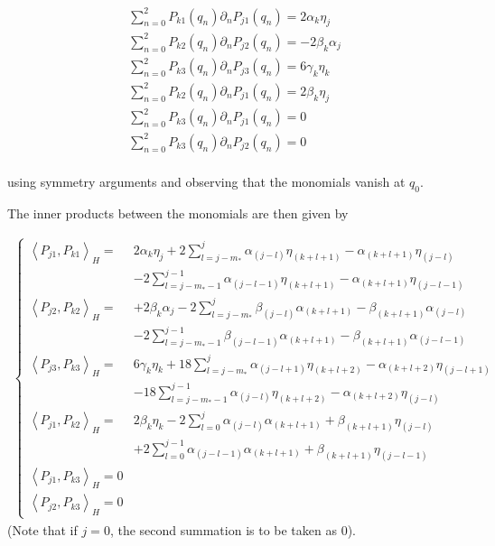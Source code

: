 \documentclass[12pt]{article}
\theoremstyle{plain}
\theoremstyle{definition}
\theoremstyle{remark}
\newcommand{\inner}[2]{\left \langle #1, #2\right \rangle}
\begin{document}
\begin{gather*}
    \sum_{n = 0}^2 P_{k1}(q_n)\partial_nP_{j1}(q_n) = 2\alpha_k\eta_j\\
    \sum_{n = 0}^2 P_{k2}(q_n)\partial_nP_{j2}(q_n) = -2\beta_k\alpha_j\\
    \sum_{n = 0}^2 P_{k3}(q_n)\partial_nP_{j3}(q_n) = 6\gamma_k\eta_k\\
    \sum_{n = 0}^2 P_{k2}(q_n)\partial_nP_{j1}(q_n) = 2\beta_k\eta_j\\
    \sum_{n = 0}^2 P_{k3}(q_n)\partial_nP_{j1}(q_n) = 0\\
    \sum_{n = 0}^2 P_{k3}(q_n)\partial_nP_{j2}(q_n) = 0\\
\end{gather*}

using symmetry arguments and observing that the monomials vanish at $q_0$.


The inner products between the monomials are then given by

\begin{align}
    \begin{cases}
    \inner{P_{j1}}{P_{k1}}_H =  &2\alpha_k\eta_j + 2\sum\limits_{l=j-m_*}^j \alpha_{(j-l)}\eta_{(k+l+1)} - \alpha_{(k+l+1)}\eta_{(j-l)} \\[20pt]&- 2\sum\limits_{l=j-m_*-1}^{j-1} \alpha_{(j-l-1)}\eta_{(k+l+1)} - \alpha_{(k+l+1)}\eta_{(j-l-1)} \\[20pt]
    \inner{P_{j2}}{P_{k2}}_H = &+ 2\beta_k\alpha_j -2\sum\limits_{l=j-m_*}^j \beta_{(j-l)}\alpha_{(k+l+1)} - \beta_{(k+l+1)}\alpha_{(j-l)} \\[20pt]&- 2\sum\limits_{l=j-m_*-1}^{j-1} \beta_{(j-l-1)}\alpha_{(k+l+1)} - \beta_{(k+l+1)}\alpha_{(j-l-1)} \\[20pt]
    \inner{P_{j3}}{P_{k3}}_H =  &6\gamma_k\eta_k + 18\sum\limits_{l=j-m_*}^j \alpha_{(j-l+1)}\eta_{(k+l+2)} - \alpha_{(k+l+2)}\eta_{(j-l+1)} \\[20pt]&- 18\sum\limits_{l=j-m_*-1}^{j-1} \alpha_{(j-l)}\eta_{(k+l+2)} - \alpha_{(k+l+2)}\eta_{(j-l)} \\[20pt]
    \inner{P_{j1}}{P_{k2}}_H = &2\beta_k\eta_k -2\sum\limits_{l=0}^j \alpha_{(j-l)}\alpha_{(k+l+1)} + \beta_{(k+l+1)}\eta_{(j-l)} \\[20pt]&+2 \sum\limits_{l=0}^{j-1} \alpha_{(j-l-1)}\alpha_{(k+l+1)} + \beta_{(k+l+1)}\eta_{(j-l-1)} \\[20pt]
    \inner{P_{j1}}{P_{k3}}_H = 0\\
    \inner{P_{j2}}{P_{k3}}_H = 0
    \end{cases}
\end{align}
(Note that if $j = 0$, the second summation is to be taken as 0).
\end{document}
